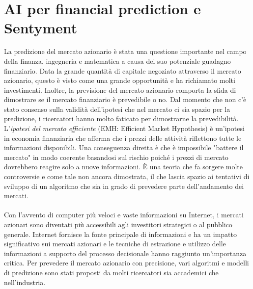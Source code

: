 \documentclass[a4paper,12pt]{report}
\begin{document}
\newpage
\chapter{AI per financial prediction e Sentyment}
\label{cap2}
La predizione del mercato azionario è stata una questione importante nel campo della finanza, ingegneria e matematica a causa del suo potenziale guadagno finanziario. Data la grande quantità di capitale negoziato attraverso il mercato azionario, questo è visto come una grande opportunità e ha richiamato molti investimenti. Inoltre, la previsione del mercato azionario comporta la sfida di dimostrare se il mercato finanziario è prevedibile o no. Dal momento che non c'è stato consenso sulla validità dell'ipotesi che nel mercato ci sia spazio per la predizione, i ricercatori hanno molto faticato per dimostrarne la prevedibilità\cite{nn1}. L'\textit{ipotesi del mercato efficiente} (EMH: Efficient Market Hypothesis) è un'ipotesi in economia finanziaria che afferma che i prezzi delle attività riflettono tutte le informazioni disponibili. Una conseguenza diretta è che è impossibile "battere il mercato" in modo coerente basandosi sul rischio poiché i prezzi di mercato dovrebbero reagire solo a nuove informazioni. È una teoria che fa sorgere molte controversie e come tale non ancora dimostrata, il che lascia spazio ai tentativi di sviluppo di un algoritmo che sia in grado di prevedere parte dell'andamento dei mercati.\\~\\
Con l'avvento di computer più veloci e vaste informazioni su Internet, i mercati azionari sono diventati più accessibili agli investitori strategici o al pubblico generale. Internet fornisce la fonte principale di informazioni e ha un impatto significativo sui mercati azionari e le tecniche di estrazione e utilizzo delle informazioni a supporto del processo decisionale hanno raggiunto un'importanza critica. Per prevedere il mercato azionario con precisione, vari algoritmi e modelli di predizione sono stati proposti da molti ricercatori sia accademici che nell'industria.\\~\\
\end{document}
